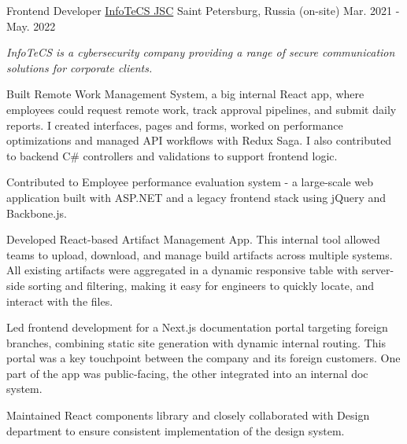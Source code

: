 \begin{cventries}
  \cventry
    {Frontend Developer} %
    {\href{https://infotecs.ru/}{InfoTeCS JSC}}
    {Saint Petersburg, Russia (on-site)} %
    {Mar. 2021 - May. 2022} %
    {
      \begin{cvitems} %
      \vspace{8pt}
      \item[] {\small\textit{InfoTeCS is a cybersecurity company providing a range of secure communication solutions for corporate clients.}}
      \vspace{8pt}
        \item {Built Remote Work Management System, a big internal React app, where employees could request remote work, track approval pipelines, and submit daily reports. I created interfaces, pages and forms, worked on performance optimizations and managed API workflows with Redux Saga. I also contributed to backend C\# controllers and validations to support frontend logic. }
        \item {Contributed to Employee performance evaluation system - a large-scale web application built with ASP.NET and a legacy frontend stack using jQuery and Backbone.js.}
        \item {Developed React-based Artifact Management App. This internal tool allowed teams to upload, download, and manage build artifacts across multiple systems. All existing artifacts were aggregated in a dynamic responsive table with server-side sorting and filtering, making it easy for engineers to quickly locate, and interact with the files.}
        \item {Led frontend development for a Next.js documentation portal targeting foreign branches, combining static site generation with dynamic internal routing. This portal was a key touchpoint between the company and its foreign customers. One part of the app was public-facing, the other integrated into an internal doc system.}
        \item {Maintained React components library and closely collaborated with Design department to ensure consistent implementation of the design system.}
      \end{cvitems}
    }
    {\vspace{24pt}}


\end{cventries}
